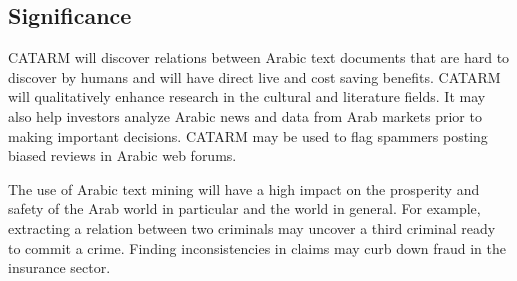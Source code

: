 \documentclass[12pt]{article}
\begin{document}
 
\subsection{Significance} 

CATARM will discover relations between Arabic text documents that 
are hard to discover by humans and will have direct live and
cost saving benefits.%
CATARM will qualitatively enhance research in the cultural and 
literature fields. 
It may also help investors analyze Arabic news and data from Arab 
markets prior to making important decisions.
CATARM may be used to flag spammers 
posting biased reviews in Arabic web forums.

The use of Arabic text mining  will 
have a high impact on the prosperity and safety of the Arab world 
in particular and the world in general.
For example, extracting a relation between two criminals may 
uncover a third criminal ready to commit a crime.
Finding inconsistencies in claims may curb down fraud 
in the insurance sector.
\end{document}
